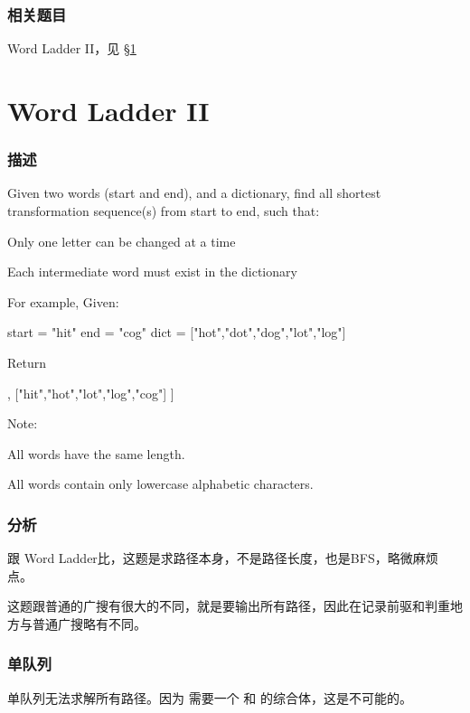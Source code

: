 \subsubsection{相关题目}

\begindot
\item Word Ladder II，见 \S \ref{sec:word-ladder-ii}
\myenddot


\section{Word Ladder II} %
\label{sec:word-ladder-ii}


\subsubsection{描述}
Given two words (start and end), and a dictionary, find all shortest transformation sequence(s) from start to end, such that:
\begindot
\item Only one letter can be changed at a time
\item Each intermediate word must exist in the dictionary
\myenddot

For example, Given:
\begin{Code}
start = "hit"
end = "cog"
dict = ["hot","dot","dog","lot","log"]
\end{Code}
Return
\begin{Code}
[
    ["hit","hot","dot","dog","cog"],
    ["hit","hot","lot","log","cog"]
]
\end{Code}

Note:
\begindot
\item All words have the same length.
\item All words contain only lowercase alphabetic characters.
\myenddot


\subsubsection{分析}
跟 Word Ladder比，这题是求路径本身，不是路径长度，也是BFS，略微麻烦点。

这题跟普通的广搜有很大的不同，就是要输出所有路径，因此在记录前驱和判重地方与普通广搜略有不同。


\subsubsection{单队列}

单队列无法求解所有路径。因为 需要一个  和  的综合体，这是不可能的。


